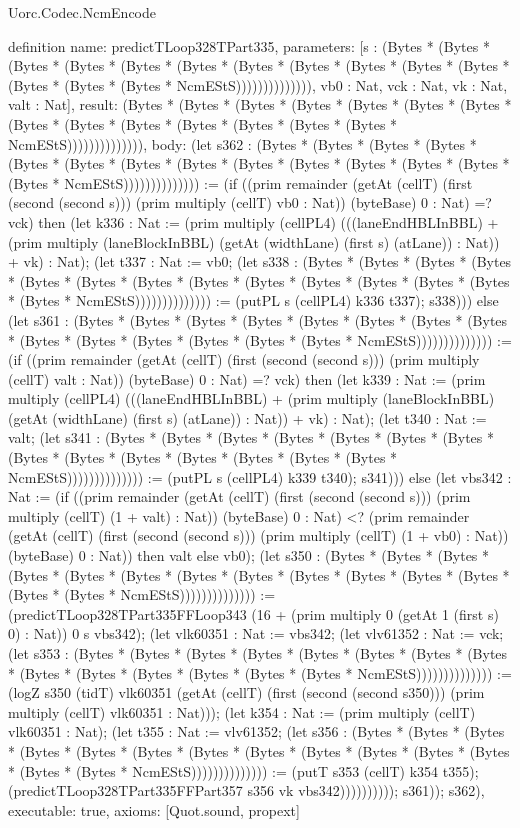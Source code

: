 \begin{lexlean}{Uorc.Codec.NcmEncode}
\begin{semanticmodule}
definition{
  name: predictTLoop328TPart335,
  parameters: [s : (Bytes * (Bytes * (Bytes * (Bytes * (Bytes * (Bytes * (Bytes * (Bytes * (Bytes * (Bytes * (Bytes * (Bytes * (Bytes * (Bytes * NcmEStS)))))))))))))), vb0 : Nat, vck : Nat, vk : Nat, valt : Nat],
  result: (Bytes * (Bytes * (Bytes * (Bytes * (Bytes * (Bytes * (Bytes * (Bytes * (Bytes * (Bytes * (Bytes * (Bytes * (Bytes * (Bytes * NcmEStS)))))))))))))),
  body: (let s362 : (Bytes * (Bytes * (Bytes * (Bytes * (Bytes * (Bytes * (Bytes * (Bytes * (Bytes * (Bytes * (Bytes * (Bytes * (Bytes * (Bytes * NcmEStS)))))))))))))) := (if ((prim remainder (getAt (cellT) (first (second (second s))) (prim multiply (cellT) vb0 : Nat)) (byteBase) 0 : Nat) =? vck) then (let k336 : Nat := (prim multiply (cellPL4) (((laneEndHBLInBBL) + (prim multiply (laneBlockInBBL) (getAt (widthLane) (first s) (atLane)) : Nat)) + vk) : Nat); (let t337 : Nat := vb0; (let s338 : (Bytes * (Bytes * (Bytes * (Bytes * (Bytes * (Bytes * (Bytes * (Bytes * (Bytes * (Bytes * (Bytes * (Bytes * (Bytes * (Bytes * NcmEStS)))))))))))))) := (putPL s (cellPL4) k336 t337); s338))) else (let s361 : (Bytes * (Bytes * (Bytes * (Bytes * (Bytes * (Bytes * (Bytes * (Bytes * (Bytes * (Bytes * (Bytes * (Bytes * (Bytes * (Bytes * NcmEStS)))))))))))))) := (if ((prim remainder (getAt (cellT) (first (second (second s))) (prim multiply (cellT) valt : Nat)) (byteBase) 0 : Nat) =? vck) then (let k339 : Nat := (prim multiply (cellPL4) (((laneEndHBLInBBL) + (prim multiply (laneBlockInBBL) (getAt (widthLane) (first s) (atLane)) : Nat)) + vk) : Nat); (let t340 : Nat := valt; (let s341 : (Bytes * (Bytes * (Bytes * (Bytes * (Bytes * (Bytes * (Bytes * (Bytes * (Bytes * (Bytes * (Bytes * (Bytes * (Bytes * (Bytes * NcmEStS)))))))))))))) := (putPL s (cellPL4) k339 t340); s341))) else (let vbs342 : Nat := (if ((prim remainder (getAt (cellT) (first (second (second s))) (prim multiply (cellT) (1 + valt) : Nat)) (byteBase) 0 : Nat) <? (prim remainder (getAt (cellT) (first (second (second s))) (prim multiply (cellT) (1 + vb0) : Nat)) (byteBase) 0 : Nat)) then valt else vb0); (let s350 : (Bytes * (Bytes * (Bytes * (Bytes * (Bytes * (Bytes * (Bytes * (Bytes * (Bytes * (Bytes * (Bytes * (Bytes * (Bytes * (Bytes * NcmEStS)))))))))))))) := (predictTLoop328TPart335FFLoop343 (16 + (prim multiply 0 (getAt 1 (first s) 0) : Nat)) 0 s vbs342); (let vlk60351 : Nat := vbs342; (let vlv61352 : Nat := vck; (let s353 : (Bytes * (Bytes * (Bytes * (Bytes * (Bytes * (Bytes * (Bytes * (Bytes * (Bytes * (Bytes * (Bytes * (Bytes * (Bytes * (Bytes * NcmEStS)))))))))))))) := (logZ s350 (tidT) vlk60351 (getAt (cellT) (first (second (second s350))) (prim multiply (cellT) vlk60351 : Nat))); (let k354 : Nat := (prim multiply (cellT) vlk60351 : Nat); (let t355 : Nat := vlv61352; (let s356 : (Bytes * (Bytes * (Bytes * (Bytes * (Bytes * (Bytes * (Bytes * (Bytes * (Bytes * (Bytes * (Bytes * (Bytes * (Bytes * (Bytes * NcmEStS)))))))))))))) := (putT s353 (cellT) k354 t355); (predictTLoop328TPart335FFPart357 s356 vk vbs342)))))))))); s361)); s362),
  executable: true,
  axioms: [Quot.sound, propext]
}


\end{semanticmodule}
\end{lexlean}
